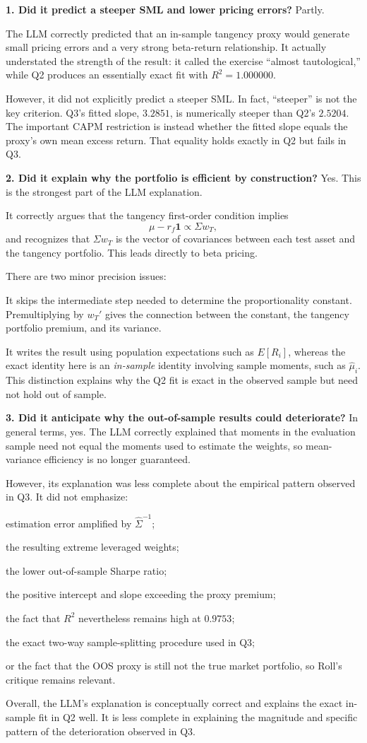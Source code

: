 \textbf{1. Did it predict a steeper SML and lower pricing errors?} Partly.

The LLM correctly predicted that an in-sample tangency proxy would generate
small pricing errors and a very strong beta-return relationship. It actually
understated the strength of the result: it called the exercise ``almost
tautological,'' while Q2 produces an essentially exact fit with
$R^2 = 1.000000$.

However, it did not explicitly predict a steeper SML. In fact, ``steeper'' is
not the key criterion. Q3's fitted slope, $3.2851$, is numerically steeper than
Q2's $2.5204$. The important CAPM restriction is instead whether the fitted
slope equals the proxy's own mean excess return. That equality holds exactly in
Q2 but fails in Q3.

\textbf{2. Did it explain why the portfolio is efficient by construction?} Yes.
This is the strongest part of the LLM explanation.

It correctly argues that the tangency first-order condition implies
\[
\mu - r_f\mathbf{1} \propto \Sigma w_T ,
\]
and recognizes that $\Sigma w_T$ is the vector of covariances between each test
asset and the tangency portfolio. This leads directly to beta pricing.

There are two minor precision issues:
\begin{tight}
\item It skips the intermediate step needed to determine the proportionality
constant. Premultiplying by $w_T'$ gives the connection between the constant,
the tangency portfolio premium, and its variance.
\item It writes the result using population expectations such as $E[R_i]$,
whereas the exact identity here is an \emph{in-sample} identity involving
sample moments, such as $\hat\mu_i$. This distinction explains why the Q2 fit
is exact in the observed sample but need not hold out of sample.
\end{tight}

\textbf{3. Did it anticipate why the out-of-sample results could deteriorate?}
In general terms, yes. The LLM correctly explained that moments in the
evaluation sample need not equal the moments used to estimate the weights, so
mean-variance efficiency is no longer guaranteed.

However, its explanation was less complete about the empirical pattern observed
in Q3. It did not emphasize:
\begin{tight}
\item estimation error amplified by $\hat\Sigma^{-1}$;
\item the resulting extreme leveraged weights;
\item the lower out-of-sample Sharpe ratio;
\item the positive intercept and slope exceeding the proxy premium;
\item the fact that $R^2$ nevertheless remains high at $0.9753$;
\item the exact two-way sample-splitting procedure used in Q3;
\item or the fact that the OOS proxy is still not the true market portfolio, so
Roll's critique remains relevant.
\end{tight}

Overall, the LLM's explanation is conceptually correct and explains the exact
in-sample fit in Q2 well. It is less complete in explaining the magnitude and
specific pattern of the deterioration observed in Q3.
